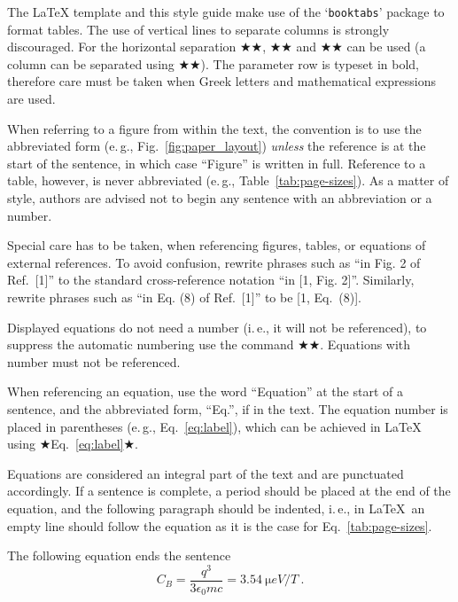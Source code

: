 \documentclass[%
               hyphens,       %
               ]{jacow}
\begin{document}
The \LaTeX{} template and this style guide make use of the ‘\texttt{booktabs}’ package to
format tables. The use of vertical lines to separate columns is strongly discouraged. 
For the horizontal separation ★\toprule★, ★\midrule★ 
and ★\bottomrule★ can be used (a column can be separated using ★\cmidrule★).
The parameter row is typeset in bold, therefore care must be taken
when Greek letters and mathematical expressions are used.

When referring to a figure from within the text, the
convention is to use the abbreviated form (e.\,g., Fig.~\ref{fig:paper_layout})
\emph{unless} the reference is at the start of the sentence, in
which case “Figure” is written in full. Reference to a
table, however, is never abbreviated (e.\,g., Table~\ref{tab:page-sizes}).
As a matter of style, authors are advised not to begin any sentence with an abbreviation or a number.

Special care has to be taken, when referencing figures, tables, or equations of external references.
To avoid confusion, rewrite phrases such as “in Fig. 2 of Ref.~[1]” to the standard cross-reference notation “in [1, Fig. 2]”. Similarly, rewrite phrases such as “in Eq. (8) of Ref.~[1]” to be [1, Eq.~(8)].

Displayed equations do not need a number (i.\,e., it will not be
referenced), to suppress the automatic numbering use the command ★\nonumber★. 
Equations with number must not be referenced.

When referencing an equation, use the word
“Equation” at the start of a sentence, and the abbreviated
form, “Eq.”, if in the text. The equation number is placed
in parentheses (e.\,g., Eq.~\eqref{eq:label}), which can be 
achieved in \LaTeX{} using ★Eq.~\eqref{eq:label}★.

Equations are considered an integral part of the text and are punctuated accordingly. 
If a sentence is complete, a period should be placed at the end of the equation, 
and the following paragraph should be indented, 
i.\,e., in \LaTeX\ an empty line should follow the equation as it is the case for Eq.~\eqref{tab:page-sizes}.

The following equation ends the sentence
\begin{equation}\label{eq:label}
    C_B=\frac{q^3}{3\epsilon_{0} mc} = \qty{3.54}{\micro eV/T} \ .
\end{equation}
\end{document}
